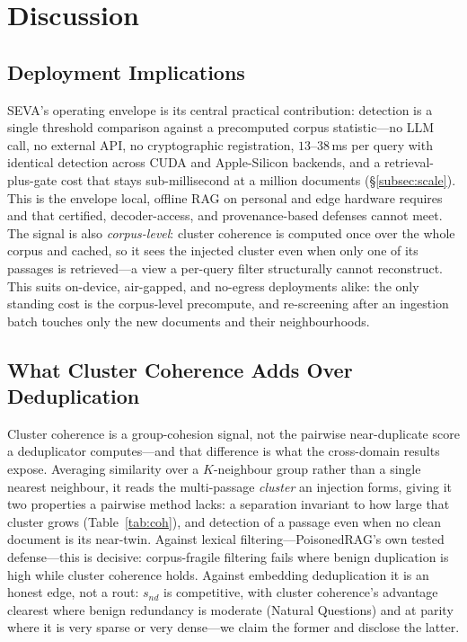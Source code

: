 \documentclass[conference]{IEEEtran}
\begin{document}
\section{Discussion}

\subsection{Deployment Implications}
SEVA's operating envelope is its central practical contribution: detection is a single
threshold comparison against a precomputed corpus statistic---no LLM call, no external API, no
cryptographic registration, $13$--$38$\,ms per query with identical detection across CUDA and
Apple-Silicon backends, and a retrieval-plus-gate cost that stays sub-millisecond at a million
documents (\S\ref{subsec:scale}). This is the envelope local, offline RAG on personal and edge
hardware requires and that certified, decoder-access, and provenance-based defenses cannot
meet. The signal is also \emph{corpus-level}: cluster coherence is computed once over the whole
corpus and cached, so it sees the injected cluster even when only one of its passages is
retrieved---a view a per-query filter structurally cannot reconstruct. This suits on-device,
air-gapped, and no-egress deployments alike: the only standing cost is the corpus-level
precompute, and re-screening after an ingestion batch touches only the new documents and their
neighbourhoods.

\subsection{What Cluster Coherence Adds Over Deduplication}
Cluster coherence is a group-cohesion signal, not the pairwise near-duplicate score a
deduplicator computes---and that difference is what the cross-domain results expose. Averaging
similarity over a $K$-neighbour group rather than a single nearest neighbour, it reads the
multi-passage \emph{cluster} an injection forms, giving it two properties a pairwise method
lacks: a separation invariant to how large that cluster grows (Table~\ref{tab:coh}), and
detection of a passage even when no clean document is its near-twin. Against lexical
filtering---PoisonedRAG's own tested defense---this is decisive: corpus-fragile filtering fails
where benign duplication is high while cluster coherence holds. Against embedding deduplication
it is an honest edge, not a rout: $s_{nd}$ is competitive, with cluster coherence's advantage
clearest where benign redundancy is moderate (Natural Questions) and at parity where it is very
sparse or very dense---we claim the former and disclose the latter.
\end{document}

